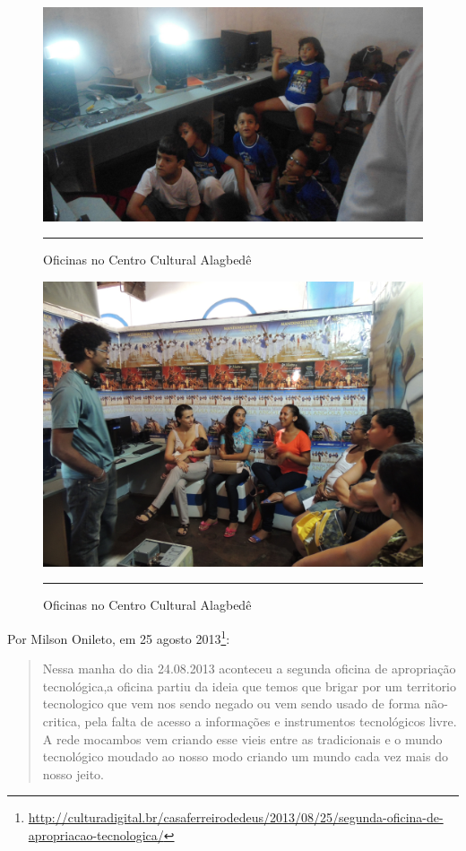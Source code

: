 \documentclass[a4paper, 11pt, oneside]{Relatorio_sem}  %
\begin{document}
\begin{figure}[htbp]
  \centering
  \includegraphics[width=\textwidth]{./Fig/Oficina_julho_MA_milson_1.pdf}
  \rule{35em}{0.5pt}
  \caption[Oficinas no Centro Cultural Alagbedê]{Oficinas no Centro Cultural Alagbedê}
  \label{fig:OficinaMA1}
\end{figure}
\begin{figure}[htbp]
  \centering
  \includegraphics[width=\textwidth]{./Fig/Oficina_julho_MA_milson_2.pdf}
  \rule{35em}{0.5pt}
  \caption[Oficinas no Centro Cultural Alagbedê]{Oficinas no Centro Cultural Alagbedê}
  \label{fig:OficinaMA2}
\end{figure}


Por Milson Onileto, em 25 agosto
2013\footnote{\url{http://culturadigital.br/casaferreirodedeus/2013/08/25/segunda-oficina-de-apropriacao-tecnologica/}}:
\begin{quote}
  Nessa manha do dia 24.08.2013 aconteceu a segunda oficina de
  apropriação tecnológica,a oficina partiu da ideia que temos que
  brigar por um territorio tecnologico que vem nos sendo negado ou vem
  sendo usado de forma não-critica, pela falta de acesso a informações
  e instrumentos tecnológicos livre. A rede mocambos vem criando esse
  vieis entre as tradicionais e o mundo tecnológico moudado ao nosso
  modo criando um mundo cada vez mais do nosso jeito.
\end{quote}
\end{document}
